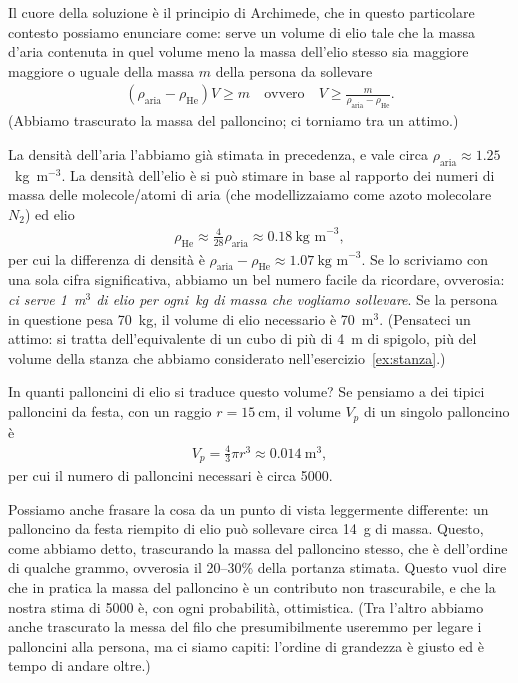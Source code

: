 \begin{solution}

Il cuore della soluzione \`e il principio di Archimede, che in questo particolare
contesto possiamo enunciare come: serve un volume di elio tale che la massa d'aria
contenuta in quel volume meno la massa dell'elio stesso sia maggiore maggiore o uguale
della massa $m$ della persona da sollevare
\begin{align*}
  (\rho_\text{aria} - \rho_\text{He}) V \geq m
  \quad\text{ovvero}\quad
  V \geq \frac{m}{\rho_\text{aria} - \rho_\text{He}}.
\end{align*}
(Abbiamo trascurato la massa del palloncino; ci torniamo tra un attimo.)

La densit\`a dell'aria l'abbiamo gi\`a stimata in precedenza, e vale circa
$\rho_\text{aria} \approx 1.25$~kg~m$^{-3}$. La densit\`a dell'elio \`e si pu\`o
stimare in base al rapporto dei numeri di massa delle molecole/atomi di aria (che
modellizzaiamo come azoto molecolare $N_2$) ed elio
\begin{align*}
  \rho_\text{He} \approx \frac{4}{28} \rho_\text{aria}
  \approx 0.18~\text{kg~m}^{-3},
\end{align*}
per cui la differenza di densit\`a \`e
$\rho_\text{aria} - \rho_\text{He} \approx 1.07~\text{kg~m}^{-3}$. Se lo scriviamo
con una sola cifra significativa, abbiamo un bel numero facile da ricordare, ovverosia:
\emph{ci serve 1~m$^3$ di elio per ogni~kg di massa che vogliamo sollevare}.
Se la persona in questione pesa 70~kg, il volume di elio necessario \`e 70~m$^3$.
(Pensateci un attimo: si tratta dell'equivalente di un cubo di pi\`u di 4~m di spigolo,
pi\`u del volume della stanza che abbiamo considerato nell'esercizio~\ref{ex:stanza}.)

In quanti palloncini di elio si traduce questo volume? Se pensiamo a dei tipici palloncini
da festa, con un raggio $r = 15~\text{cm}$, il volume $V_p$ di un singolo palloncino \`e
\begin{align*}
  V_p = \frac{4}{3} \pi r^3 \approx 0.014~\text{m}^3,
\end{align*}
per cui il numero di palloncini necessari \`e circa 5000.

Possiamo anche frasare la cosa da un punto di vista leggermente differente: un palloncino
da festa riempito di elio pu\`o sollevare circa 14~g di massa. Questo, come abbiamo detto,
trascurando la massa del palloncino stesso, che \`e dell'ordine di qualche grammo,
ovverosia il 20--30\% della portanza stimata. Questo vuol dire che in pratica la massa
del palloncino \`e un contributo non trascurabile, e che la nostra stima di 5000 \`e,
con ogni probabilit\`a, ottimistica. (Tra l'altro abbiamo anche trascurato la messa
del filo che presumibilmente useremmo per legare i palloncini alla persona, ma ci siamo
capiti: l'ordine di grandezza \`e giusto ed \`e tempo di andare oltre.)


\end{solution}



